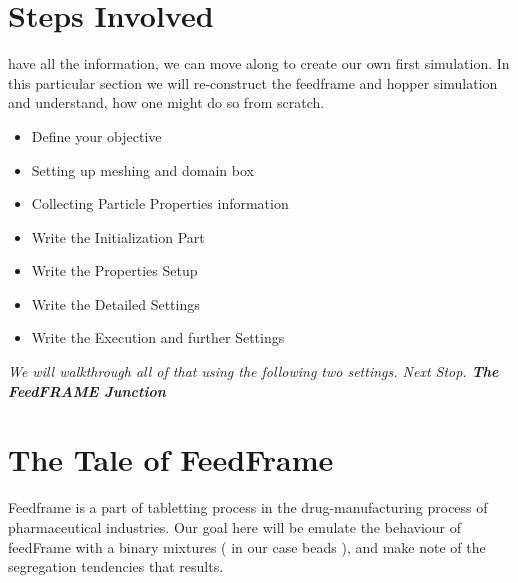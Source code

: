 \documentclass{tufte-book} %
\begin{document}
\section{Steps Involved}
\begin{fullwidth}
   have all the information, we can move along to create our own first simulation. In this particular section we will re-construct the feedframe and hopper simulation and understand, how one might do so from scratch. 
\end{fullwidth}

\begin{itemize}
\item Define your objective
\item Setting up meshing and domain box
\item Collecting Particle Properties information
\item Write the Initialization Part
\item Write the Properties Setup
\item Write the Detailed Settings
\item Write the Execution and further Settings
\end{itemize}

\textit{We will walkthrough all of that using the following two settings. Next Stop. \textbf{The FeedFRAME Junction} }

\section{The Tale of FeedFrame}

Feedframe is a part of tabletting process in the drug-manufacturing process of pharmaceutical industries. Our goal here will be emulate the behaviour of feedFrame with a binary mixtures ( in our case beads ), and make note of the segregation tendencies that results.
\end{document}
